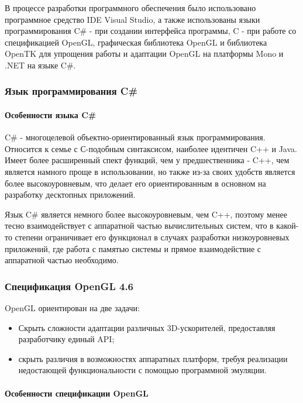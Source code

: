 В процессе разработки программного обеспечения было использовано программное средство IDE Visual Studio, а также использованы языки программирования C\# - при создании интерфейса программы, C - при работе со спецификацией OpenGL, графическая библиотека OpenGL и библиотека OpenTK для упрощения работы и адаптации OpenGL на платформы Mono и .NET на языке C\#.

\subsubsection{Язык программирования C\#}

\paragraph{Особенности языка C\#}

C\# - многоцелевой объектно-ориентированный язык программирования. Относится к семье с С-подобным синтаксисом, наиболее идентичен C++ и Java. Имеет более расширенный спект функций, чем у предшественника - C++, чем является намного проще в использовании, но также из-за своих удобств является более высокоуровневым, что делает его ориентированным в основном на разработку десктопных приложений.

Язык C\# является немного более высокоуровневым, чем C++, поэтому менее тесно взаимодействует с аппаратной частью вычислительных систем, что в какой-то степени ограничивает его функционал в случаях разработки низкоуровневых приложений, где работа с памятью системы и прямое взаимодействие с аппаратной частью необходимо.

\subsubsection{Спецификация OpenGL 4.6}

OpenGL ориентирован на две задачи:
\begin{itemize}
	\item Скрыть сложности адаптации различных 3D-ускорителей, предоставляя разработчику единый API;
	\item скрыть различия в возможностях аппаратных платформ, требуя реализации недостающей функциональности с помощью программной эмуляции.
\end{itemize}

\paragraph{Особенности спецификации OpenGL}

